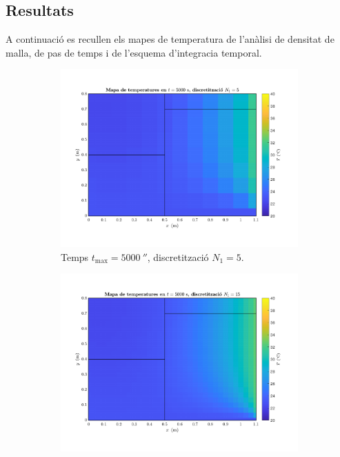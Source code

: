 
\subsection{Resultats}

A continuació es recullen els mapes de temperatura de l'anàlisi de densitat de malla, de pas de temps i de l'esquema d'integracia temporal.

\begin{figure}[ht]
	\centering
	\begin{subfigure}{.5\textwidth}
		\centering
		\includegraphics[width=.95\linewidth]{imagenes/04_analisi_influencia_dades_numeriques/malla/malla_1.pdf}
		\vspace{-15pt}
		\caption{Temps $t_\text{max} = 5000 \ \second$, discretització $N_1 = 5$.}
		\label{fig:malla_1}
	\end{subfigure}%
	\begin{subfigure}{.5\textwidth}
		\centering
		\includegraphics[width=.95\linewidth]{imagenes/04_analisi_influencia_dades_numeriques/malla/malla_2.pdf}

\end{subfigure}
\end{figure}
